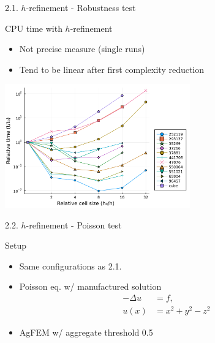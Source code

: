 \documentclass{beamer}
\begin{document}
\begin{frame}{2.1. $h$-refinement - Robustness test}

  \begin{block}{CPU time with $h$-refinement}
  \begin{itemize}
    \item
      Not precise measure (single runs)
    \item
      Tend to be linear after first complexity reduction
  \end{itemize}
  \end{block}

  \centering
  \includegraphics[width=0.60\textwidth]{../analysis/plots/x_nmax_y_time}

\end{frame}

\begin{frame}{2.2. $h$-refinement - Poisson test}
  \begin{block}{Setup}
    \begin{itemize}
      \item
        Same configurations as 2.1.
      \item
        Poisson eq. w/ manufactured solution
        \begin{align*}
          -\Delta u &= f,\\
          u(x) &= x^2+y^2-z^2
        \end{align*}
      \item
        AgFEM w/ aggregate threshold 0.5
    \end{itemize}
  \end{block}
%

\end{frame}
\end{document}
